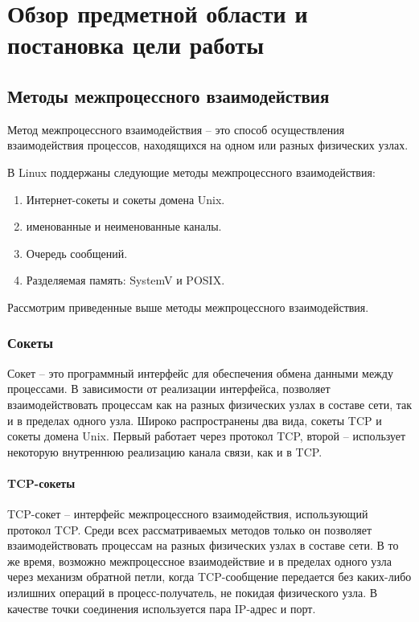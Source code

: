 \chapter{Обзор предметной области и постановка цели работы}

\startrelatedwork

\section{Методы межпроцессного взаимодействия}

Метод межпроцессного взаимодействия -- это способ осуществления взаимодействия процессов, находящихся на одном или разных физических узлах.

В Linux поддержаны следующие методы межпроцессного взаимодействия:
\begin{enumerate}
\item Интернет-сокеты и сокеты домена Unix.
\item именованные и неименованные каналы.
\item Очередь сообщений.
\item Разделяемая память: SystemV и POSIX.
\end{enumerate}

Рассмотрим приведенные выше методы межпроцессного взаимодействия.

\subsection{Сокеты}

Сокет -- это программный интерфейс для обеспечения обмена данными между процессами. В зависимости от реализации интерфейса, позволяет взаимодействовать процессам как на разных физических узлах в составе сети, так и в пределах одного узла. Широко распространены два вида, сокеты TCP и сокеты домена Unix. Первый работает через протокол TCP, второй -- использует некоторую внутреннюю реализацию канала связи, как и в TCP.

\subsubsection{TCP-сокеты}
TCP-сокет -- интерфейс межпроцессного взаимодействия, использующий протокол TCP. Среди всех рассматриваемых методов только он позволяет взаимодействовать процессам на разных физических узлах в составе сети. В то же время, возможно межпроцессное взаимодействие и в пределах одного узла через механизм обратной петли, когда TCP-сообщение передается без каких-либо излишних операций в процесс-получатель, не покидая физического узла. В качестве точки соединения используется пара IP-адрес и порт.

